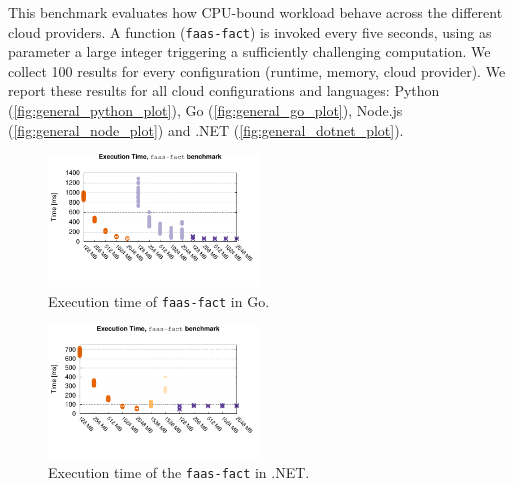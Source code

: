 This benchmark evaluates how CPU-bound workload behave across the different cloud providers.
A function (\texttt{faas-fact}) is invoked every five seconds, using as parameter a large integer triggering a sufficiently challenging computation. 
We collect 100 results for every configuration (runtime, memory, cloud provider).
We report these results for all cloud configurations and languages: Python (\autoref{fig:general_python_plot}), Go (\autoref{fig:general_go_plot}), Node.js (\autoref{fig:general_node_plot}) and .NET (\autoref{fig:general_dotnet_plot}).


\begin{figure}[!t]
\centering
\includegraphics[width=0.5\textwidth, trim={0 40 0 0}]{bilder/general_go/cpufact.pdf}
\caption{Execution time of \texttt{faas-fact} in Go.}
\label{fig:general_go_plot}
\end{figure}

\begin{figure}[!t]
\centering
\includegraphics[width=0.5\textwidth, trim={0 40 0 0}]{bilder/general_dotnet/cpufact.pdf}
\caption{Execution time of the \texttt{faas-fact} in .NET.}
\label{fig:general_dotnet_plot}
\end{figure}

